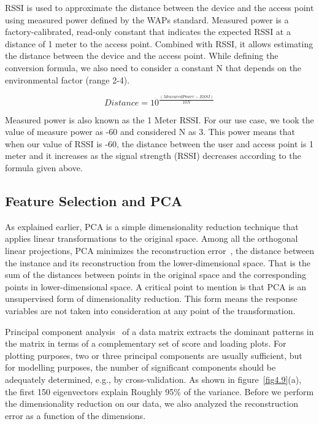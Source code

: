 \documentclass[a4paper,singleside,12pt]{report} %
\begin{document}
				RSSI is used to approximate the distance between the device and the access point using measured power defined by the WAPs standard. 
				Measured power is a factory-calibrated, read-only constant that indicates the expected RSSI at a distance of 1 meter to the access point. 
				Combined with RSSI, it allows estimating the distance between the device and the access point. 
				While defining the conversion formula, we also need to consider a constant N that depends on the environmental factor (range 2-4).

				\[Distance = 10^{\frac{(Measured Power - RSSI)}{10N}}\]
				
				Measured power is also known as the 1 Meter RSSI. 
				For our use case, we took the value of measure power as -60 and considered N as 3. 
				This power means that when our value of RSSI is -60, the distance between the user and access point is 1 meter and it increases as the signal strength (RSSI) decreases according to the formula given above.

			\subsection{Feature Selection and PCA}

				As explained earlier, PCA is a simple dimensionality reduction technique that applies linear transformations to the original space. 
				Among all the orthogonal linear projections, PCA minimizes the reconstruction error~\cite{jablonski2015principal}, the distance between the instance and its reconstruction from the lower-dimensional space. 
				That is the sum of the distances between points in the original space and the corresponding points in lower-dimensional space.
				A critical point to mention is that PCA is an unsupervised form of dimensionality reduction.
				This form means the response variables are not taken into consideration at any point of the transformation. 
				
				Principal component analysis~\cite{wold1987principal} of a data matrix extracts the dominant patterns in the matrix in terms of a complementary set of score and loading plots. 
				For plotting purposes, two or three principal components are usually sufficient, but for modelling purposes, the number of significant components should be adequately determined, e.g., by cross-validation.
				As shown in figure~\ref{fig4.9}(a), the first 150 eigenvectors explain Roughly 95\% of the variance. 
				Before we perform the dimensionality reduction on our data, we also analyzed the reconstruction error as a function of the dimensions.
				
\end{document}
